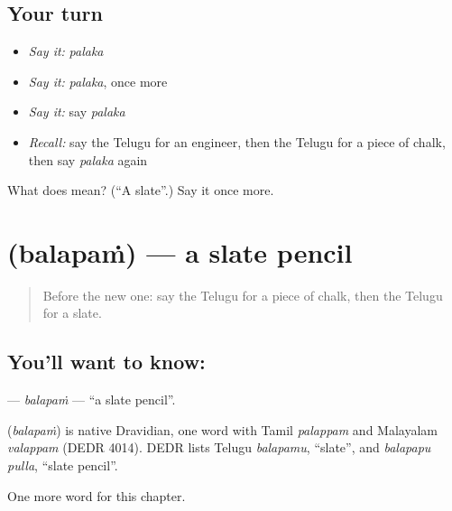 \subsection*{Your turn}
\begin{itemize}
\raggedright
  \item \emph{Say it:} \emph{palaka}
  \item \emph{Say it:} \emph{palaka}, once more
  \item \emph{Say it:} say \emph{palaka}
  \item \emph{Recall:} say the Telugu for an engineer, then the Telugu for a piece of chalk, then say \emph{palaka} again
\end{itemize}

\begin{tcolorbox}[breakable,colback=teal!4,colframe=teal!35!black,title={Before you move on}]
What does  mean? (\textquotedblleft{}A slate\textquotedblright{}.) Say it once more.
\end{tcolorbox}
\section[\texorpdfstring{\te{బలపం} (balapaṁ)}{బలపం (balapaṁ)}]{ (balapaṁ) — a slate pencil}

\label{lesson:TE-C313-balapam}



\begin{quote}
Before the new one: say the Telugu for a piece of chalk, then the Telugu for a slate.
\end{quote}

\subsection*{You'll want to know: }
\textbf{} — \emph{balapaṁ} — \textquotedblleft{}a slate pencil\textquotedblright{}.

\begin{cousinweb}
\textbf{} (\emph{balapaṁ}) is native Dravidian, one word with Tamil \emph{palappam} and Malayalam \emph{valappam} (DEDR 4014). DEDR lists Telugu \emph{balapamu}, \textquotedblleft{}slate\textquotedblright{}, and \emph{balapapu pulla}, \textquotedblleft{}slate pencil\textquotedblright{}.
\end{cousinweb}

\begin{grammarlens}[title={What you've built}]
One more word for this chapter.
\end{grammarlens}

